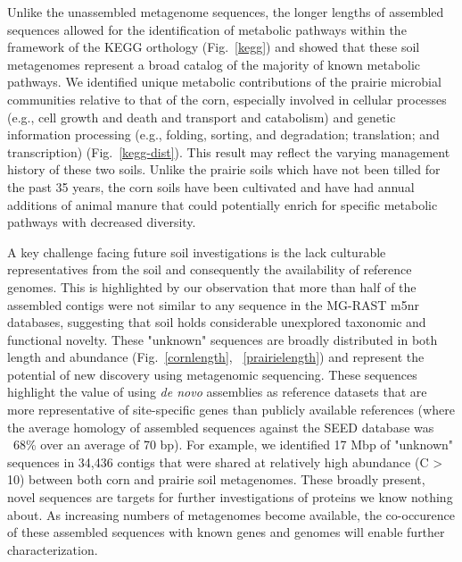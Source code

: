 \documentclass{pnastwo}
\begin{document}
\begin{article}
Unlike the unassembled metagenome sequences, the longer lengths of assembled
sequences allowed for the identification of metabolic pathways within the framework of 
the KEGG orthology (Fig.~\ref{kegg}) and showed that these
soil metagenomes represent a broad catalog of the majority of known metabolic pathways. We
identified unique metabolic contributions of the prairie microbial communities
relative to that of the corn, especially involved in cellular processes (e.g.,
cell growth and death and transport and catabolism) and genetic information
processing (e.g., folding, sorting, and degradation; translation; and
transcription) (Fig.~\ref{kegg-dist}). This result may reflect the varying management
history of these two soils. Unlike the prairie soils which have not been tilled
for the past 35 years, the corn soils have been cultivated and have had annual additions of animal manure
that could potentially enrich for specific metabolic pathways with decreased
diversity.

A key challenge facing future soil investigations is the lack culturable representatives from the soil and consequently the availability of reference genomes.  
This is highlighted by our observation that more than half of the assembled contigs were not similar to any sequence
in the MG-RAST m5nr databases, suggesting that soil holds considerable unexplored taxonomic
and functional novelty. These "unknown" sequences are
broadly distributed in both length and abundance (Fig.~\ref{cornlength}, ~\ref{prairielength}) and
represent the potential of new discovery using metagenomic sequencing. 
These sequences highlight the value of using {\em de novo}
assemblies as reference datasets that are more representative of site-specific
genes than publicly available references (where the average homology of assembled
sequences against the SEED database was ~68\% over an average of 70 bp).  For example, we
identified 17 Mbp of "unknown" sequences in 34,436 contigs that were shared at relatively high abundance (C > 10) between both corn and prairie soil metagenomes.  These broadly present, novel sequences are targets for further
investigations of proteins we know nothing about. As increasing numbers of metagenomes become available, the co-occurence of these assembled sequences with known genes and genomes will enable further characterization.


\end{article}
\end{document}
